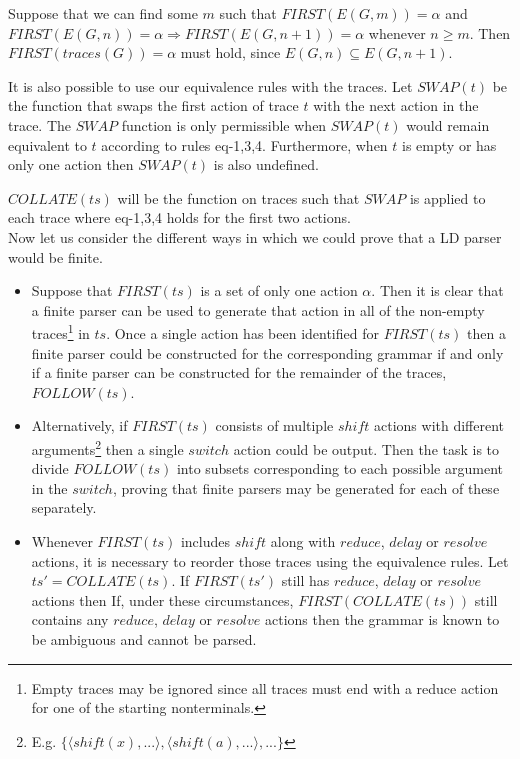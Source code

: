 \documentclass[envcountsame,runningheads]{llncs}
\begin{document}
Suppose that we can find some $m$ such that $F\!I\!RST(E(G,m)) = \alpha$ and $F\!I\!RST(E(G,n)) = \alpha \Rightarrow FIRST(E(G,n+1)) = \alpha$ whenever $n \geq m$.
Then $F\!I\!RST(traces(G)) = \alpha$ must hold, since $E(G,n) \subseteq E(G, n+1)$.

It is also possible to use our equivalence rules with the traces. 
Let $SW\!AP(t)$ be the function that swaps the first action of trace $t$ with the next action in the trace.
The $SW\!AP$ function is only permissible when $SW\!AP(t)$ would remain equivalent to $t$ according to rules eq-1,3,4.
Furthermore, when $t$ is empty or has only one action then $SW\!AP(t)$ is also undefined.

$COLLATE(ts)$ will be the function on traces such that $SW\!AP$ is applied to each trace where eq-1,3,4 holds for the first two actions. \\

Now let us consider the different ways in which we could prove that a LD parser would be finite.
\begin{itemize}
  \item Suppose that $F\!I\!RST(ts)$ is a set of only one action $\alpha$. 
        Then it is clear that a finite parser can be used to generate that action in all of the non-empty traces\footnote{Empty traces may be ignored since all traces must end with a reduce action for one of the starting nonterminals.} in $ts$.
        Once a single action has been identified for $F\!I\!RST(ts)$ then a finite parser could be constructed for the corresponding grammar if and only if a finite parser can be constructed for the remainder of the traces, $FOLLOW(ts)$.

  \item Alternatively, if $F\!I\!RST(ts)$ consists of multiple $shi\!ft$ actions with different arguments\footnote{E.g. $\{\langle shi\!ft(x), ... \rangle, \langle shi\!ft(a), ... \rangle, ... \}$} then 
        a single $switch$ action could be output. Then the task is to divide $FOLLOW(ts)$ into subsets corresponding to each possible argument in the $switch$, proving that finite parsers may be generated for each of these separately.

  \item Whenever $F\!I\!RST(ts)$ includes $shi\!ft$ along with $reduce$, $delay$ or $resolve$ actions, it is necessary to reorder those traces using the equivalence rules.
        Let $ts' = COLLATE(ts)$. If $F\!I\!RST(ts')$ still has $reduce$, $delay$ or $resolve$ actions then 
        If, under these circumstances, $F\!I\!RST(COLLATE(ts))$ still contains any $reduce$, $delay$ or $resolve$ actions then the grammar is known to be ambiguous and cannot be parsed.
\end{itemize}
\end{document}
